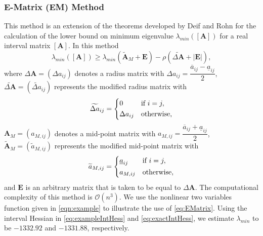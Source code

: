 \documentclass{elsarticle}
\numberwithin{equation}{section}
\begin{document}
\subsubsection{E-Matrix (EM) Method}
This method is an extension of the theorems developed by Deif \cite{deif1991interval} and Rohn \cite{rohn1998bounds} for the calculation of the lower bound on minimum eigenvalue $\lambda_{min}([\mathbf{A}])$ for a real interval matrix $[\mathbf{A}]$. In this method
\begin{equation}
    \lambda_{min}(\mathbf{[A]}) \geq \lambda_{min}(\widetilde{\mathbf{A}}_M + \mathbf{E}) - \rho(\widetilde{\Delta \mathbf{A}} + |\mathbf{E}|),
    \label{eq:EMatrix}
\end{equation}
where  $\Delta \mathbf{A} = (\Delta a_{ij})$ denotes a radius matrix with $\Delta a_{ij} = \dfrac{\overline{a}_{ij} - \underline{a}_{ij}}{2}$, $\widetilde{\Delta \mathbf{A}} = (\widetilde{\Delta a}_{ij})$ represents the modified radius matrix with
    \[
    \widetilde{\Delta a}_{ij} = 
    \begin{dcases}
    0 & \text{if } i = j, \\
    \Delta a_{ij} & \text{otherwise},
    \end{dcases}
    \]
 $\mathbf{A}_M = (a_{M,ij})$ denotes a mid-point matrix with $a_{M,ij} = \dfrac{\overline{a}_{ij} + \underline{a}_{ij}}{2}$,  $\tilde{\mathbf{A}}_M = (\widetilde{a}_{M,ij})$ represents the modified mid-point matrix with
    \[
    \widetilde{a}_{M,ij} = 
    \begin{dcases}
    \underline{a}_{ij} & \text{if } i = j, \\
    a_{M,ij} & \text{otherwise},
    \end{dcases}
    \]
and $\mathbf{E}$ is an arbitrary matrix that is taken to be equal to $\Delta \mathbf{A}$. The computational complexity of this method is $\mathcal{O}(n^3)$. We use the nonlinear two variables function given in \eqref{eqn:example} to illustrate the use of \eqref{eq:EMatrix}. Using the interval Hessian in \eqref{eq:exampleIntHess} and \eqref{eq:exactIntHess}, we estimate $\lambda_{min}$ to be $-1332.92$ and $-1331.88$, respectively.
\end{document}
